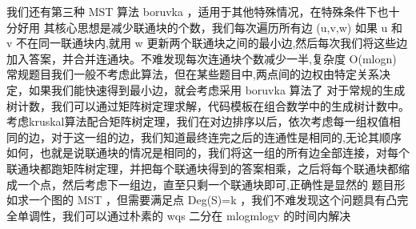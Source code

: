 {}我们还有第三种\markdownRendererDollarSign{} MST \markdownRendererDollarSign{}算法\markdownRendererDollarSign{} boruvka \markdownRendererDollarSign{}，适用于其他特殊情况，在特殊条件下也十分好用\markdownRendererParagraphSeparator
{}其核心思想是减少联通块的个数，我们每次遍历所有边\markdownRendererDollarSign{} (u,v,w) \markdownRendererDollarSign{}如果\markdownRendererDollarSign{} u \markdownRendererDollarSign{}和\markdownRendererDollarSign{} v \markdownRendererDollarSign{}不在同一联通块内,就用\markdownRendererDollarSign{} w \markdownRendererDollarSign{}更新两个联通块之间的最小边,然后每次我们将这些边加入答案，并合并连通块。不难发现每次连通块个数减少一半,复杂度\markdownRendererDollarSign{} O(mlogn) \markdownRendererDollarSign{}\markdownRendererParagraphSeparator
{}常规题目我们一般不考虑此算法，但在某些题目中,两点间的边权由特定关系决定，如果我们能快速得到最小边，就会考虑采用\markdownRendererDollarSign{} boruvka \markdownRendererDollarSign{}算法了\markdownRendererInterblockSeparator
{}
\markdownRendererSectionEnd \markdownRendererSectionBegin
{}\markdownRendererInterblockSeparator
{}\markdownRendererInterblockSeparator
{}
\markdownRendererSectionEnd 
\markdownRendererSectionEnd \markdownRendererSectionBegin
{}\markdownRendererInterblockSeparator
{}对于常规的生成树计数，我们可以通过矩阵树定理求解，代码模板在组合数学中的生成树计数中。\markdownRendererInterblockSeparator
{}\markdownRendererSectionBegin
{}\markdownRendererInterblockSeparator
{}考虑kruskal算法配合矩阵树定理，我们在对边排序以后，依次考虑每一组权值相同的边，对于这一组的边，我们知道最终连完之后的连通性是相同的,无论其顺序如何，也就是说联通块的情况是相同的，我们将这一组的所有边全部连接，对每个联通块都跑矩阵树定理，并把每个联通块得到的答案相乘，之后将每个联通块都缩成一个点，然后考虑下一组边，直至只剩一个联通块即可,正确性是显然的\markdownRendererInterblockSeparator
{}
\markdownRendererSectionEnd 
\markdownRendererSectionEnd \markdownRendererSectionBegin
{}\markdownRendererInterblockSeparator
{}题目形如求一个图的\markdownRendererDollarSign{} MST \markdownRendererDollarSign{}，但需要满足点\markdownRendererDollarSign{} Deg(S)=k \markdownRendererDollarSign{}，我们不难发现这个问题具有凸完全单调性，我们可以通过朴素的\markdownRendererDollarSign{} wqs \markdownRendererDollarSign{}二分在\markdownRendererDollarSign{} mlogmlogv \markdownRendererDollarSign{}的时间内解决\markdownRendererInterblockSeparator
